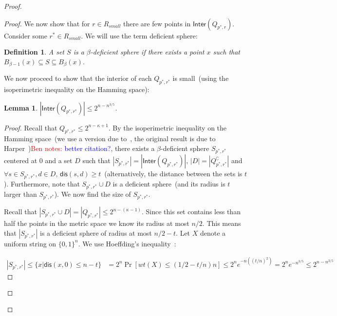 \documentclass[11pt]{article}
\newcommand{\class}[1]{{\ensuremath{\mathsf{#1}}}}
\newcommand{\crust}{\ensuremath{\class{Crust}}\xspace}
\newcommand{\inter}{\ensuremath{\class{Inter}}\xspace}
\newcommand{\zo}{\ensuremath{\{0, 1\}}}
\newcommand{\dis}{\ensuremath{\mathsf{dis}}}
\newtheorem{lemma}[theorem]{Lemma}
\newtheorem{definition}[theorem]{Definition}
\newcommand{\authnote}[2]{{\textcolor{red}{\textsf{#1 notes: }\textcolor{blue}{ #2}}\marginpar{\textcolor{red}{\textbf{!!!!!}}}}}
\newcommand{\authnote}[2]{}
\newcommand{\bnote}[1]{{\authnote{Ben}{#1}}}
\begin{document}
\begin{proof}
\begin{proof}
We now show that for $r\in R_{small}$ there are few points in $\inter(Q_{p^*, r})$.  Consider some $r^*\in R_{small}$.  We will use the term deficient sphere:
\begin{definition}
A set $S$ is a $\beta$-deficient sphere if there exists a point $x$ such that $B_{\beta-1}(x) \subseteq S \subseteq B_{\beta}(x)$.
\end{definition}

We now proceed to show that the interior of each $Q_{p^*, r^*}$ is small~(using the isoperimetric inequality on the Hamming space):

\begin{lemma}
$|\inter(Q_{p^*, r^*})| \le 2^{n-n^{3/5}}$.
\end{lemma}
\begin{proof}
Recall that $Q_{p^*, r^*} \le 2^{n-\kappa+1}$.  By the isoperimetric inequality on the Hamming space~(we use a version due to~\cite[Theorem 1]{frankl1981short}, the original result is due to Harper~\cite{harper1966optimal})\bnote{better citation?}, there exists a $\beta$-deficient sphere $S_{p^*, r^*}$ centered at $0$ and a set $D$ such that $|S_{p^*, r^*}| = |\inter(Q_{p^*, r^*})|$, $|D| = |Q_{p^*, r^*}^\complement|$ and $\forall s\in S_{p^*, r^*}, d\in D$, $\dis(s, d) \ge t$~(alternatively, the distance between the sets is $t$).  Furthermore, note that $S_{p^*, r^*} \cup D$ is a deficient sphere~(and its radius is $t$ larger than $S_{p^*, r^*}$).
We now find the size of $S_{p^*, r^*}$.

Recall that $|S_{p^*, r^*} \cup D| = |Q_{p^*, r^*} | \le 2^{n-(\kappa-1)}$.  Since this set contains less than half the points in the metric space we know its radius at most $n/2$.  This means that $|S_{p^*, r^*}|$ is a deficient sphere of radius at most $n/2-t$.  Let $X$ denote a uniform string on $\zo^n$.  We use Hoeffding's inequality~\cite{hoeffding1963probability}:

\begin{align*}
|S_{p^*, r^*}| \le \{ x | \dis (x, 0)\le n-t\} &= 2^n \Pr[ wt(X) \le (1/2-t/n)n] \le 2^n e^{-n ((t/n)^2)} = 2^n e^{-n^{3/5}} \le 2^{n - n^{3/5}}
\end{align*}


\end{proof}
\end{proof}
\end{proof}
\end{document}
